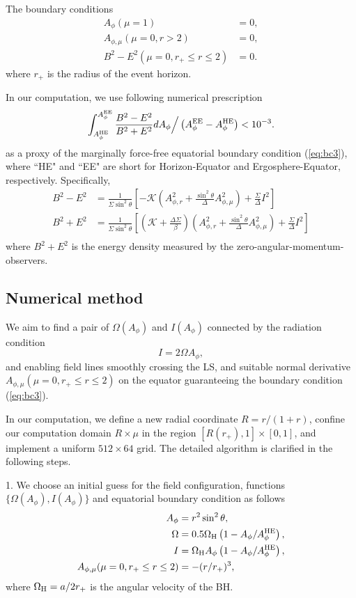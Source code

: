 \documentclass[aps,prd,reprint,nofootinbib, superscriptaddress]{revtex4-1}
\def\sst{\sin^2\theta}
\def\Ap{A_\phi}
\def\Ar{A_{\phi,r}}
\def\Am{A_{\phi,\mu}}
\def\be{\begin{equation}}
\def\ee{\end{equation}}
\def\WH{\Omega_{\rm H}}
\def\AHE{A_\phi^{\rm HE}}
\begin{document}
The boundary conditions
\begin{subequations}
\begin{align}
    A_\phi(\mu = 1) &= 0,  \label{eq:bc1}\\
    \Am(\mu = 0, r > 2) &= 0, \label{eq:bc2}\\
    B^2-E^2 (\mu = 0, r_+ \leq r \leq 2) &=0.\label{eq:bc3}
\end{align}
\end{subequations}
where $r_+$ is the radius of the event horizon.

In our computation, we use following numerical prescription
\be
\label{eq:nbc}
\int_{A_\phi^{\rm HE}}^{A_\phi^{\rm EE}} \frac{B^2-E^2}{B^2+E^2} dA_\phi \Big/ \left(A_\phi^{\rm EE}- A_\phi^{\rm HE}\right)  < 10^{-3}.
\ee
as a proxy of the marginally force-free equatorial boundary condition (\ref{eq:bc3}),
where ``HE" and ``EE" are short for Horizon-Equator and Ergosphere-Equator, respectively.
Specifically,
\be
\begin{aligned}
B^2-E^2 &= \frac{1}{\Sigma \sst} \left[ -\mathcal{K} \left(\Ar^2 +\frac{\sst}{\Delta}\Am^2 \right)+\frac{\Sigma}{\Delta}I^2\right]\\
B^2+E^2 &= \frac{1}{\Sigma \sst} \left[ \left(\mathcal{K}+\frac{\Delta\Sigma}{\beta} \right) \left(\Ar^2 +\frac{\sst}{\Delta}\Am^2 \right)+\frac{\Sigma}{\Delta}I^2\right]\\
\end{aligned}
\ee
where $B^2+E^2$ is the energy density measured by the zero-angular-momentum-observers.

\subsection{Numerical method}
We aim to find a pair of $\Omega(A_\phi)$ and $I(A_\phi)$ connected by the radiation condition
\be I = 2\Omega A_\phi, \label{eq:rad}\ee
and enabling field lines smoothly crossing the LS,
and suitable normal derivative $\Am(\mu =0, r_+\leq r \leq 2)$ on the equator
guaranteeing the boundary condition (\ref{eq:bc3}).

In our computation, we define a new radial coordinate $R=r/(1+r)$, confine our
computation domain $R\times \mu$ in the region $[R(r_+), 1]\times [0,1]$,
and implement a uniform $512\times 64$ grid. The detailed algorithm is clarified
in the following steps.

1. We choose an initial guess for the field configuration, functions
$\{ \Omega(\Ap), I(\Ap)\}$
and equatorial boundary condition as follows
\begin{subequations}
\begin{align}
    \Ap &= r^2 \sst,  \label{eq:gss1} \\
    \Omega & = 0.5\WH\left(1-\Ap/\AHE\right),  \label{eq:gss2}\\
    I & = \WH \Ap\left(1-\Ap/\AHE\right) , \\
    \Am(\mu =0, r_+\leq r \leq 2) & = - (r/r_+)^3, \label{eq:gss3}
\end{align}
\end{subequations}
where $\WH = a/2r_+$ is the angular velocity of the BH.
\end{document}
